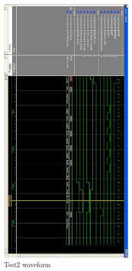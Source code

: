 \begin{figure}
\centering
\includegraphics[width=0.6\textwidth]{img/wavetest2.png}
\caption{Test2 waveform}
\label{fig:test2}
\end{figure}

